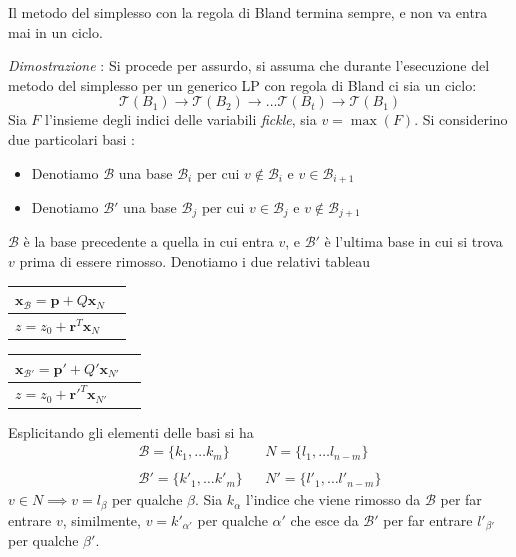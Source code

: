 \documentclass[10pt, letterpaper]{report}
\begin{document}
\begin{teorema}
    Il metodo del simplesso con la regola di Bland termina sempre, e non va entra mai in un ciclo.
\end{teorema}
\textit{Dimostrazione} : Si procede per assurdo, si assuma che durante l'esecuzione del metodo del simplesso per un generico LP con regola di Bland ci sia un ciclo: 
$$\mathcal  T(B_1)\rightarrow\mathcal  T(B_2)\rightarrow\dots \mathcal  T(B_t)\rightarrow \mathcal  T(B_1)$$
Sia $F$ l'insieme degli indici delle variabili \textit{fickle}, sia $v=\max(F)$. Si considerino due particolari basi : \begin{itemize}
    \item Denotiamo $\mathcal B$ una base $\mathcal B_i$ per cui $v\notin \mathcal B_i$ e $v\in \mathcal B_{i+1}$
    \item  Denotiamo $\mathcal B'$ una base $\mathcal B_j$ per cui $v\in \mathcal B_j$ e $v\notin \mathcal B_{j+1}$
\end{itemize} 
$\mathcal B$ è la base precedente a quella in cui entra $v$, e $\mathcal B'$ è l'ultima base in cui si trova $v$ prima di essere rimosso. Denotiamo i due relativi tableau
\begin{center}
    \begin{tabular}{|l|l|}\hline 
       $\mathbf{x}_\mathcal{B} = \mathbf p + Q\mathbf x_N$\\ \hline 
       $z=z_0+\mathbf r^T\mathbf x_N$ \\\hline 
    \end{tabular}
    \begin{tabular}{|l|l|}\hline 
        $\mathbf{x}_\mathcal{B'} = \mathbf p' + Q'\mathbf x_{N'}$\\ \hline 
        $z=z_0+{\mathbf {r}'}^T\mathbf x_{N'}$ \\\hline 
     \end{tabular}
\end{center}
Esplicitando gli elementi delle basi si ha$$ \begin{matrix}
    \mathcal{B}=\{k_1,\dots k_m\} & & N=\{l_1,\dots l_{n-m}\}\\ \\
    \mathcal{B'}=\{k'_1,\dots k'_m\} & & N'=\{l'_1,\dots l'_{n-m}\}
\end{matrix}$$
$v\in N \implies v = l_\beta$ per qualche $\beta$. Sia $k_\alpha$ l'indice che viene rimosso da $\mathcal B$ per far entrare $v$, similmente, $v=k'_{\alpha'}$ per qualche $\alpha'$ che esce da $\mathcal B'$ per far entrare $l'_{\beta '}$ per qualche $\beta '$.
\end{document}
